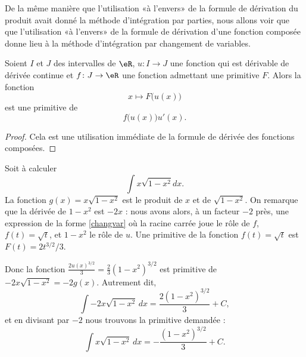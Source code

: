 De la même manière que l'utilisation «à l'envers» de la formule de dérivation du produit avait donné la méthode d'intégration par parties, nous allons voir que que l'utilisation «à l'envers» de la formule de dérivation d'une fonction composée donne lieu à la méthode d'intégration par changement de variables.
\begin{proposition}     \label{PROPooMVIUooZmvHxS}
    Soient \( I\) et \( J\) des intervalles de \( \eR\), \( u\colon I\to J\) une fonction qui est dérivable de dérivée continue et \( f\colon J\to \eR\) une fonction admettant une primitive \( F\). Alors la fonction
    \begin{equation}
        x\mapsto F\big( u(x) \big)
    \end{equation}
    est une primitive de
    \begin{equation}\label{changvar}
        f\big( u(x) \big)u'(x).
    \end{equation}
\end{proposition}

\begin{proof}
    Cela est une utilisation immédiate de la formule de dérivée des fonctions composées.
\end{proof}

\begin{example}
    Soit à calculer
    \begin{equation}
        \int x\sqrt{1-x^2}dx.
    \end{equation}
La fonction $g(x) = x\sqrt{1-x^2}$ est le produit de $x$ et de $\sqrt{1-x^2}$. On remarque que la dérivée de $1-x^2$ est $-2x$ : nous avons alors, à un facteur $-2$ près, une expression de la forme \eqref{changvar} où la racine carrée joue le r\^ole de $f$, \( f(t)=\sqrt{t}\),   et $1-x^2$ le r\^ole de $u$.  Une primitive de la fonction \( f(t)=\sqrt{t}\) est $F(t) = 2t^{3/2}/3$.

    Donc la fonction
      $  \frac{ 2u(x)^{3/2} }{ 3 }=\frac{ 2 }{ 3 }(1-x^2)^{3/2}$
    est primitive de
     $   -2x\sqrt{1-x^2} = -2 g(x)$.
    Autrement dit,
    \begin{equation}
        \int -2x\sqrt{1-x^2}\,dx=\frac{ 2 (1-x^2)^{3/2}}{ 3 } + C,
    \end{equation}
    et en divisant par \( -2\) nous trouvons la primitive demandée :
    \begin{equation}
        \int x\sqrt{1-x^2}\,dx=-\frac{ (1-x^2)^{3/2} }{ 3 } + C.
    \end{equation}
\end{example}

